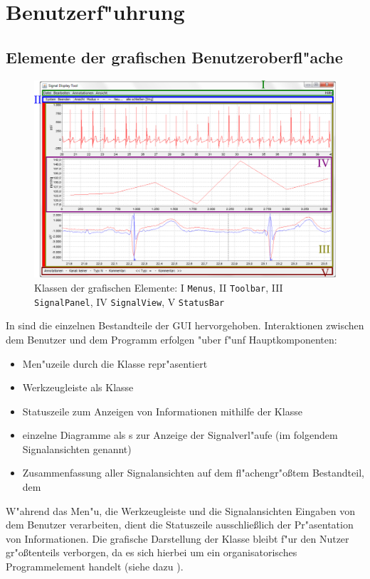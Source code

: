 \section{Benutzerf"uhrung}
\label{sec:gui}

\subsection{Elemente der grafischen Benutzeroberfl"ache}

\begin{figure}[htb]
\centering
\includegraphics[width=\textwidth]{bilder/programm_ansicht.eps}
\caption[Klassen der grafischen Elemente]{Klassen der grafischen Elemente: I \texttt{Menus}, II \texttt{Toolbar}, III \texttt{SignalPanel}, IV \texttt{SignalView}, V \texttt{StatusBar}}
\label{pic:gui_elements_and_classes}
\end{figure}

In  sind die einzelnen Bestandteile der \ac{GUI} hervorgehoben.
Interaktionen zwischen dem Benutzer und dem Programm erfolgen "uber f"unf Hauptkomponenten:
\begin{itemize}
	\item Men"uzeile durch die Klasse  repr"asentiert
	\item Werkzeugleiste als Klasse 
	\item Statuszeile zum Anzeigen von Informationen mithilfe der Klasse 
	\item einzelne Diagramme als s zur Anzeige der Signalverl"aufe (im folgendem Signalansichten genannt)
	\item Zusammenfassung aller Signalansichten auf dem fl"achengr"o{\ss}tem Bestandteil, dem 
\end{itemize}
W"ahrend das Men"u, die Werkzeugleiste und die Signalansichten Eingaben von dem Benutzer verarbeiten, dient die Statuszeile ausschlie{\ss}lich der Pr"asentation von Informationen.
Die grafische Darstellung der Klasse  bleibt f"ur den Nutzer gr"o{\ss}tenteils verborgen, da es sich hierbei um ein organisatorisches Programmelement handelt (siehe dazu ).

